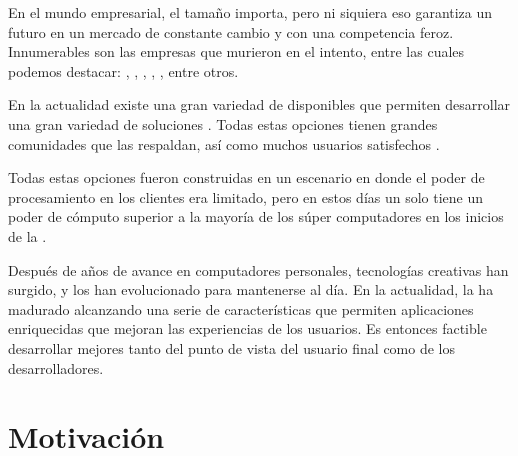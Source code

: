 En el mundo empresarial, el tamaño importa, pero ni siquiera eso garantiza un futuro en un mercado de constante cambio y con una competencia feroz. Innumerables son las empresas que murieron en el intento, entre las cuales podemos destacar: \sega, \kodak, \daewoo, \nokia, \blockbuster, entre otros.

En la actualidad existe una gran variedad de \frameworksPC \openSourcePC disponibles que permiten desarrollar una gran variedad de soluciones \ecommerceCOM. Todas estas opciones tienen grandes comunidades que las respaldan, así como muchos usuarios satisfechos \citeAllFrameworks. 

Todas estas opciones fueron construidas en un escenario en donde el poder de procesamiento en los clientes era limitado, pero en estos días un solo \iphone tiene un poder de cómputo superior a la mayoría de los súper computadores en los inicios de la \webINT. 

Después de años de avance en computadores personales, tecnologías creativas han surgido, y los \webINT \browsersINT han evolucionado para mantenerse al día. En la actualidad, la \webINT ha madurado alcanzando una serie de características que permiten aplicaciones enriquecidas que mejoran las experiencias de los usuarios. Es entonces factible desarrollar \frameworksPC \ecommerceCOM mejores tanto del punto de vista del usuario final como de los desarrolladores. 


\section{Motivación}\label{cap:intro:motivacion}


